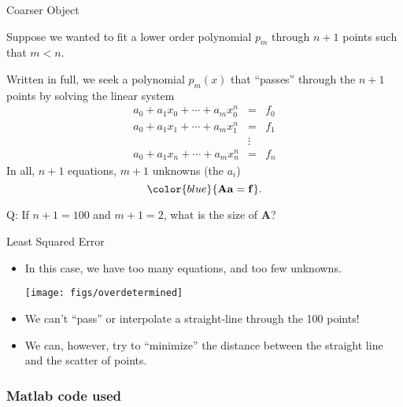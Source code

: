 \documentclass[xcolor=dvipsnames,11pt]{beamer}
\newcommand{\highlight}[1]{\textcolor{BrickRed}{#1}}
\begin{document}
\begin{frame}{Coarser Object}

Suppose we wanted to fit a lower order polynomial $p_{m}$ through $n+1$ points such that $m < n$.

\medskip

Written in full, we seek a polynomial $p_m(x)$ that ``passes'' through the $n+1$ points by solving the linear system
\begin{eqnarray}
a_0 + a_1 x_0 + \cdots + a_m x_0^n & = & f_0 \nonumber \\
a_0 + a_1 x_1 + \cdots + a_m x_1^n & = & f_1  \nonumber \\
& \vdots & \nonumber \\
a_0 + a_1 x_n + \cdots + a_m x_n^n & = & f_n \nonumber
\end{eqnarray}
In all, $n + 1$ equations, $m+1$ unknowns (the $a_i$)
$${\color{blue}{\mathbf{A a = f}}}.$$

\highlight{Q}: If $n+1 = 100$ and $m + 1= 2$, what is the size of $\mathbf{A}$?
\end{frame}

\begin{frame}{Least Squared Error}
\begin{itemize}
\item In this case, we have too many equations, and too few unknowns.

\begin{center}
\texttt{[image: figs/overdetermined]}
\end{center}
%
\item We can't ``pass'' or interpolate a straight-line through the 100 points!
\medskip
\item We can, however, try to ``minimize'' the distance between the straight line and the scatter of points.
\end{itemize}
\end{frame}

\subsubsection{Matlab code used}

\begin{frame}	
\frametitle{\subsubsecname}

\vspace{-3pt}	
	
\end{frame}
\end{document}
